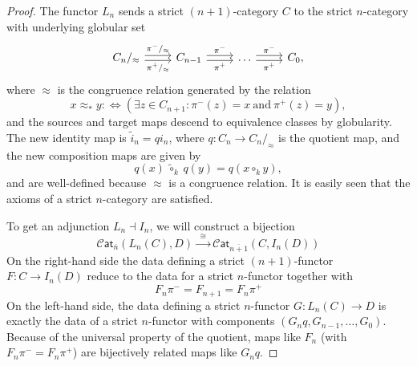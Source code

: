 \documentclass[12pt,a4paper]{article}
\numberwithin{equation}{section}
\newcommand{\cat}[1]{\mathscr{C} \mathsf{at}_{\overline{#1}}}
\begin{document}
\begin{proof}
    The functor $L_n$ sends a strict $(n+1)$-category $C$ to the strict $n$-category with underlying globular set
    \begin{equation}
        \begin{tikzcd}
            C_n/_{\approx}\arrow[r, shift left=0.5ex, "\pi^-/_\approx"] \arrow[r, shift right=0.5ex, "\pi^+/_\approx"'] & C_{n-1} \arrow[r, shift left=0.5ex, "\pi^-"] \arrow[r, shift right=0.5ex, "\pi^+"'] & \dots \arrow[r, shift left=0.5ex, "\pi^-"] \arrow[r, shift right=0.5ex, "\pi^+"'] & C_0,
        \end{tikzcd}
    \end{equation}
    where $\approx$ is the congruence relation generated by the relation
    \begin{equation}
        x \approx_* y :\Leftrightarrow \left(\exists z \in C_{n+1}: \pi^- (z) = x \ \mathrm{and} \ \pi^+ (z) = y \right),
    \end{equation}
    and the sources and target maps descend to equivalence classes by globularity. The new identity map is $\tilde{i}_n = q i_n$, where $q: C_n \to C_n/_\approx$ is the quotient map, and the new composition maps are given by
    \begin{equation}
        q(x) \ \tilde{\circ}_k \ q(y) = q (x \circ_k y),
    \end{equation}
    and are well-defined because $\approx$ is a congruence relation. It is easily seen that the axioms of a strict $n$-category are satisfied.
    
    To get an adjunction $L_n \dashv I_n$, we will construct a bijection
    \begin{equation}
        \cat{n} (L_n (C), D) \xrightarrow{\ \ \cong \ \ } \cat{n+1} (C, I_n (D))
    \end{equation}
    On the right-hand side the data defining a strict $(n+1)$-functor $F: C \to I_n (D)$ reduce to the data for a strict $n$-functor together with
    \begin{equation}
        F_n \pi^- = F_{n+1} = F_n \pi^+
    \end{equation}
    On the left-hand side, the data defining a strict $n$-functor $G: L_n (C) \to D$ is exactly the data of a strict $n$-functor with components $(G_n q, G_{n-1}, \dots, G_0)$. Because of the universal property of the quotient, maps like $F_n$ (with $ F_n \pi^- = F_n \pi^+$) are bijectively related maps like $G_n q$.
\end{proof}
\end{document}
